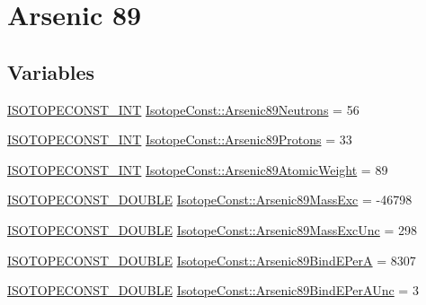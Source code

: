 \hypertarget{group___isotope_const-_arsenic-_as89}{}\section{Arsenic 89}
\label{group___isotope_const-_arsenic-_as89}
\subsection*{Variables}
\begin{DoxyCompactItemize}
\item 
\mbox{\hyperlink{group___isotope_const-_macros_ga5f18360b3e99483a35c32d789e62621c}{I\+S\+O\+T\+O\+P\+E\+C\+O\+N\+S\+T\+\_\+\+I\+NT}} \mbox{\hyperlink{group___isotope_const-_arsenic-_as89_ga178f0b00aff83c2f5f201cd9200b065a}{Isotope\+Const\+::\+Arsenic89\+Neutrons}} = 56
\item 
\mbox{\hyperlink{group___isotope_const-_macros_ga5f18360b3e99483a35c32d789e62621c}{I\+S\+O\+T\+O\+P\+E\+C\+O\+N\+S\+T\+\_\+\+I\+NT}} \mbox{\hyperlink{group___isotope_const-_arsenic-_as89_gaa585fe604efface868370e8cec67f02c}{Isotope\+Const\+::\+Arsenic89\+Protons}} = 33
\item 
\mbox{\hyperlink{group___isotope_const-_macros_ga5f18360b3e99483a35c32d789e62621c}{I\+S\+O\+T\+O\+P\+E\+C\+O\+N\+S\+T\+\_\+\+I\+NT}} \mbox{\hyperlink{group___isotope_const-_arsenic-_as89_ga988b5aa99a58d96c588738e5e512be05}{Isotope\+Const\+::\+Arsenic89\+Atomic\+Weight}} = 89
\item 
\mbox{\hyperlink{group___isotope_const-_macros_ga8f45a7272ce02c0b4c65c44636ed719a}{I\+S\+O\+T\+O\+P\+E\+C\+O\+N\+S\+T\+\_\+\+D\+O\+U\+B\+LE}} \mbox{\hyperlink{group___isotope_const-_arsenic-_as89_ga8f0f2e00f2934e9651a47b58ed383f09}{Isotope\+Const\+::\+Arsenic89\+Mass\+Exc}} = -\/46798
\item 
\mbox{\hyperlink{group___isotope_const-_macros_ga8f45a7272ce02c0b4c65c44636ed719a}{I\+S\+O\+T\+O\+P\+E\+C\+O\+N\+S\+T\+\_\+\+D\+O\+U\+B\+LE}} \mbox{\hyperlink{group___isotope_const-_arsenic-_as89_gaef851d3be98504e5b5edf9a478d57a30}{Isotope\+Const\+::\+Arsenic89\+Mass\+Exc\+Unc}} = 298
\item 
\mbox{\hyperlink{group___isotope_const-_macros_ga8f45a7272ce02c0b4c65c44636ed719a}{I\+S\+O\+T\+O\+P\+E\+C\+O\+N\+S\+T\+\_\+\+D\+O\+U\+B\+LE}} \mbox{\hyperlink{group___isotope_const-_arsenic-_as89_ga98f7bf994ea20ee47c3143f4e8092135}{Isotope\+Const\+::\+Arsenic89\+Bind\+E\+PerA}} = 8307
\item 
\mbox{\hyperlink{group___isotope_const-_macros_ga8f45a7272ce02c0b4c65c44636ed719a}{I\+S\+O\+T\+O\+P\+E\+C\+O\+N\+S\+T\+\_\+\+D\+O\+U\+B\+LE}} \mbox{\hyperlink{group___isotope_const-_arsenic-_as89_ga2434a11150b483e1e577b72fdc2a460a}{Isotope\+Const\+::\+Arsenic89\+Bind\+E\+Per\+A\+Unc}} = 3

\end{DoxyCompactItemize}
